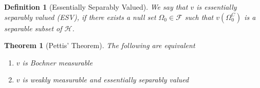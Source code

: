 \documentclass{article}
\newtheorem{theorem}{Theorem}
\numberwithin{theorem}{section}
\numberwithin{lemma}{section}
\newtheorem{definition}{Definition}
\numberwithin{definition}{section}
\numberwithin{assumption}{section}
\numberwithin{proposition}{section}
\numberwithin{remark}{section}
\numberwithin{corollary}{section}
\numberwithin{conjecture}{section}
\numberwithin{example}{section}
\newcommand{\bset}[1]{\left \lbrace #1 \right \rbrace}
\begin{document}
\begin{multicols*}{2}
\begin{definition} [Essentially Separably Valued] \label{Essentially separably valued}
    We say that $v$ is essentially separably valued (ESV), if there exists a null set $\Omega_0 \in \mathcal F$ such that $v(\Omega_0^C)$ is a separable subset of $\mathcal H$. 
\end{definition}

\begin{theorem} [Pettis' Theorem] \label{Pettis Theorem} 
    The following are equivalent 

    \begin{enumerate} 
        \item $v$ is Bochner measurable 

        \item $v$ is weakly measurable and essentially separably valued 

        


\end{enumerate}
\end{theorem}
\end{multicols*}
\end{document}
